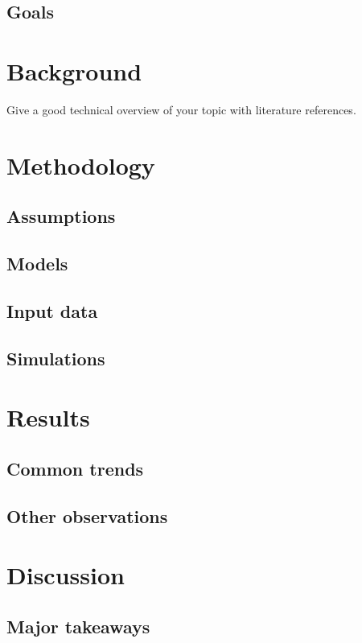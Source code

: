 \documentclass[11pt,a4paper]{article}
\begin{document}
\subsection{Goals}

\newpage

\section{Background} \label{background}
Give a good technical overview of your topic with literature references.

\newpage

\section{Methodology}
\subsection{Assumptions}
\subsection{Models}
\subsection{Input data}
\subsection{Simulations}

\newpage

\section{Results} \label{results}
\subsection{Common trends}
\subsection{Other observations}

\newpage

\section{Discussion} \label{discussion}
\subsection{Major takeaways}
\end{document}
